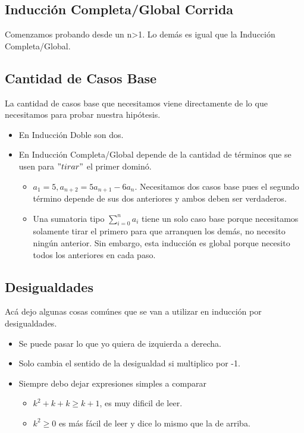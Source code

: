 \documentclass[10pt,a4paper]{article}
\begin{document}
\subsection*{Inducción Completa/Global Corrida}
Comenzamos probando desde un n>1. Lo demás es igual que la Inducción Completa/Global.
\subsection*{Cantidad de Casos Base}
La cantidad de casos base que necesitamos viene directamente de lo que necesitamos para probar nuestra hipótesis.
\begin{itemize}
    \item En Inducción Doble son dos.
    \item En Inducción Completa/Global depende de la cantidad de términos que se usen para $"tirar"$ el primer dominó.
    \begin{itemize}
        \item $ a_{1} = 5, a_{n+2} = 5a_{n+1} - 6a_{n}$. Necesitamos dos casos base pues el segundo término depende de sus dos anteriores y ambos deben ser verdaderos.
        \item Una sumatoria tipo $ \sum_{i=0}^{n}{a_{i}}$ tiene un solo caso base porque necesitamos solamente tirar el primero para que arranquen los demás, no necesito ningún anterior. Sin embargo, esta inducción es global porque necesito todos los anteriores en cada paso.
    \end{itemize}
\end{itemize}
\subsection*{Desigualdades}
Acá dejo algunas cosas comúnes que se van a utilizar en inducción por desigualdades.
\begin{itemize}
    \item Se puede pasar lo que yo quiera de izquierda a derecha.
    \item Solo cambia el sentido de la desigualdad si multiplico por -1.
    \item Siempre debo dejar expresiones simples a comparar
    \begin{itemize}
        \item $k^{2} + k + k \ge k+1$, es muy dificil de leer.
        \item $k^{2} \ge 0$ es más fácil de leer y dice lo mismo que la de arriba.
    \end{itemize}
\end{itemize}
\end{document}
